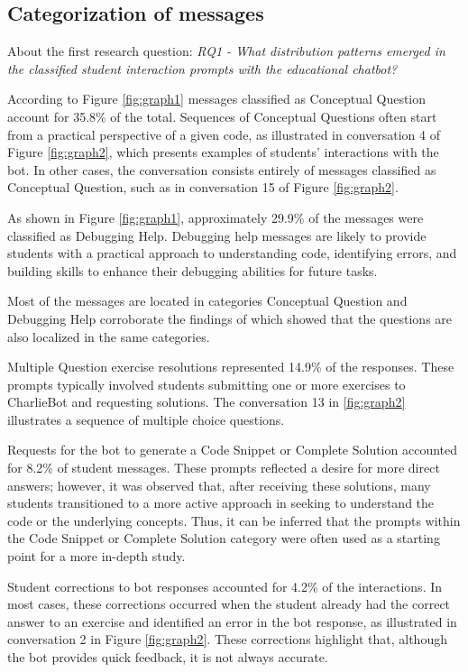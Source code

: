 \documentclass[a4paper,twoside]{article}
\begin{document}
\subsection{Categorization of messages}

About the first research question: \textit{RQ1 - What distribution patterns
emerged in the classified student interaction prompts with the educational
chatbot?}

According to Figure \ref{fig:graph1} messages classified as
Conceptual Question account for 35.8\% of the total. Sequences of Conceptual
Questions often start from a practical perspective of a given code, as
illustrated in conversation 4 of Figure \ref{fig:graph2}, which presents
examples of students' interactions with the bot. In other cases, the
conversation consists entirely of messages classified as Conceptual Question,
such as in conversation 15 of Figure \ref{fig:graph2}.

As shown in Figure \ref{fig:graph1}, approximately 29.9\% of the messages were
classified as Debugging Help. Debugging help messages are likely to provide
students with a practical approach to understanding code, identifying errors,
and building skills to enhance their debugging abilities for future tasks.

Most of the messages are located in categories Conceptual Question and Debugging
Help corroborate the findings of \cite{Ghimire24} which showed that the
questions are also localized in the same categories.

Multiple Question exercise resolutions represented 14.9\% of the responses.
These prompts typically involved students submitting one or more exercises to
CharlieBot and requesting solutions. The conversation 13 in \ref{fig:graph2}
illustrates a sequence of multiple choice questions.

Requests for the bot to generate a Code Snippet or Complete Solution accounted
for 8.2\% of student messages. These prompts reflected a desire for more
direct answers; however, it was observed that, after receiving these solutions,
many students transitioned to a more active approach in seeking to understand
the code or the underlying concepts. Thus, it can be inferred that the prompts
within the Code Snippet or Complete Solution category were often used as a
starting point for a more in-depth study.

Student corrections to bot responses accounted for 4.2\% of the interactions.
In most cases, these corrections occurred when the student already had the
correct answer to an exercise and identified an error in the bot response, as
illustrated in conversation 2 in Figure \ref{fig:graph2}. These corrections
highlight that, although the bot provides quick feedback, it is not always
accurate.
\end{document}
